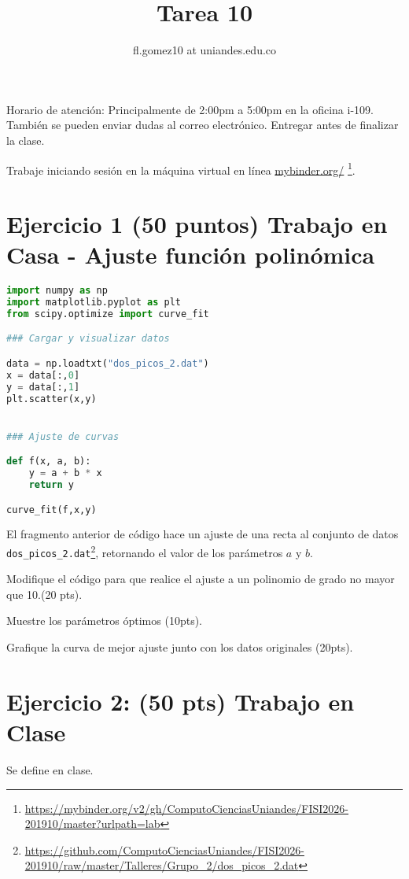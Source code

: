 \documentclass{article}
\title{Tarea 10}
\author{fl.gomez10 at uniandes.edu.co}
\begin{document}
\maketitle

Horario de atención: Principalmente de 2:00pm a 5:00pm en la oficina i-109.
También se pueden enviar dudas al correo electrónico.
Entregar antes de finalizar la clase. 

Trabaje iniciando  sesión en la máquina virtual en línea
\href{https://mybinder.org/v2/gh/ComputoCienciasUniandes/FISI2026-201910/master?urlpath=lab}{mybinder.org/}
\footnote{\url{https://mybinder.org/v2/gh/ComputoCienciasUniandes/FISI2026-201910/master?urlpath=lab}}. 


\section{Ejercicio 1 (50 puntos) Trabajo en Casa - Ajuste función polinómica}

\begin{lstlisting}[language=Python]
import numpy as np
import matplotlib.pyplot as plt
from scipy.optimize import curve_fit

### Cargar y visualizar datos

data = np.loadtxt("dos_picos_2.dat")
x = data[:,0]
y = data[:,1]
plt.scatter(x,y)


### Ajuste de curvas

def f(x, a, b):
    y = a + b * x
    return y

curve_fit(f,x,y)
\end{lstlisting}

El fragmento anterior de código hace un ajuste de una recta al conjunto de datos
\texttt{dos\_picos\_2.dat}\footnote{\url{https://github.com/ComputoCienciasUniandes/FISI2026-201910/raw/master/Talleres/Grupo_2/dos_picos_2.dat}}, retornando el valor de los parámetros $a$ y $b$.

Modifique el código para que realice el ajuste a un polinomio de
grado no mayor que 10.(20 pts).

Muestre los parámetros óptimos (10pts).

Grafique la curva de mejor ajuste junto con los datos originales (20pts).

\section{Ejercicio 2: (50 pts) Trabajo en Clase}

Se define en clase.
\end{document}
